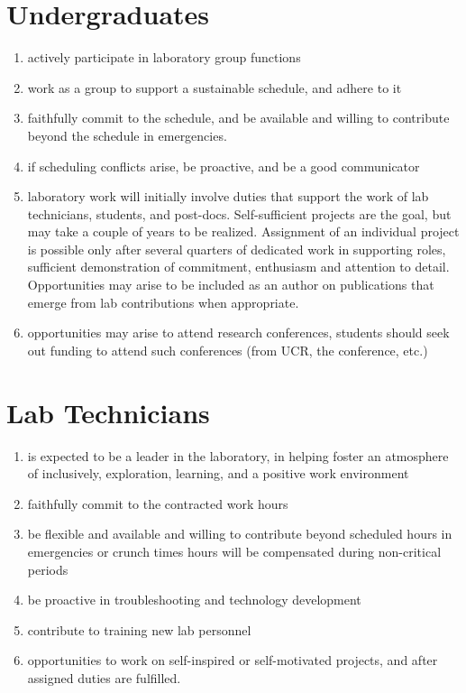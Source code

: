 \documentclass[12pt]{article}
\begin{document}
\section{Undergraduates}
\begin{enumerate}
\item actively participate in laboratory group functions
\item work as a group to support a sustainable schedule, and adhere to
  it
\item faithfully commit to the schedule, and be available and willing
  to contribute beyond the schedule in emergencies.
\item if scheduling conflicts arise, be proactive, and be a good
  communicator
\item laboratory work will initially involve duties that support the
  work of lab technicians, students, and post-docs. Self-sufficient
  projects are the goal, but may take a couple of years to be
  realized. Assignment of an individual project is possible only after
  several quarters of dedicated work in supporting roles, sufficient
  demonstration of commitment, enthusiasm and attention to
  detail. Opportunities may arise to be included as an author on
  publications that emerge from lab contributions when appropriate.
\item opportunities may arise to attend research conferences, students
  should seek out funding to attend such conferences (from UCR, the
  conference, etc.)
\end{enumerate}

\section{Lab Technicians}
\begin{enumerate}
\item is expected to be a leader in the laboratory, in helping foster
  an atmosphere of inclusively, exploration, learning, and a positive
  work environment
\item faithfully commit to the contracted work hours
\item be flexible and available and willing to contribute beyond
  scheduled hours in emergencies or crunch times hours will be
  compensated during non-critical periods
\item be proactive in troubleshooting and technology development
\item contribute to training new lab personnel
\item opportunities to work on self-inspired or self-motivated
  projects, and after assigned duties are fulfilled.
\end{enumerate}
\end{document}

